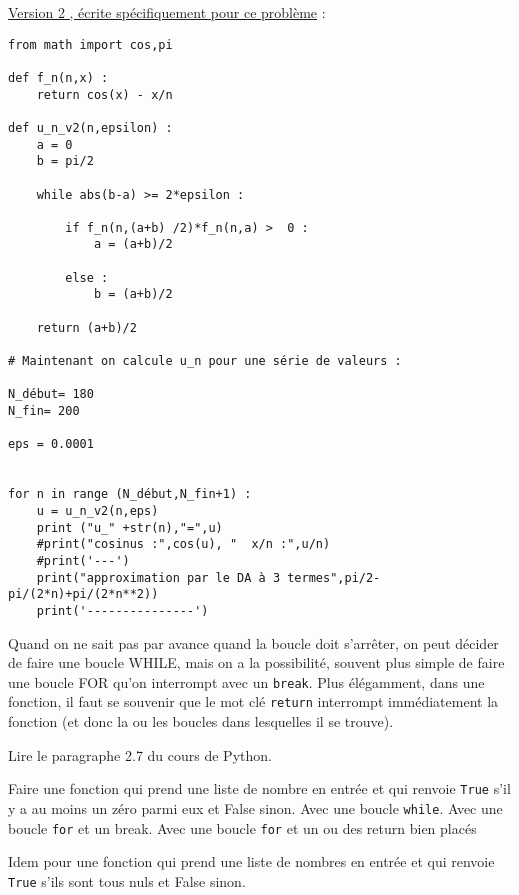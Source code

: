 \begin{correction}
	\nipuce  \ul{Version 2 , écrite spécifiquement pour ce problème} :

	\begin{verbatim}
from math import cos,pi

def f_n(n,x) :
    return cos(x) - x/n

def u_n_v2(n,epsilon) :
    a = 0
    b = pi/2

    while abs(b-a) >= 2*epsilon :

        if f_n(n,(a+b) /2)*f_n(n,a) >  0 :
            a = (a+b)/2

        else :
            b = (a+b)/2

    return (a+b)/2

# Maintenant on calcule u_n pour une série de valeurs :

N_début= 180
N_fin= 200

eps = 0.0001


for n in range (N_début,N_fin+1) :
    u = u_n_v2(n,eps)
    print ("u_" +str(n),"=",u)
    #print("cosinus :",cos(u), "  x/n :",u/n)
    #print('---')
    print("approximation par le DA à 3 termes",pi/2-pi/(2*n)+pi/(2*n**2))
    print('---------------')
\end{verbatim}
\end{correction}

\exo

\begin{enonce}
	Quand on ne sait pas par avance quand la boucle doit s'arrêter, on peut décider de faire une boucle WHILE, mais on a la possibilité, souvent plus simple de faire une boucle FOR qu'on interrompt avec un \texttt{break}. Plus élégamment, dans une fonction, il faut se souvenir que le mot clé \texttt{return} interrompt immédiatement la fonction (et donc la ou les boucles dans lesquelles il se trouve).

	\ques Lire le paragraphe 2.7 du cours de Python.



	\ques Faire une fonction qui prend une liste de nombre en entrée et qui renvoie \texttt{True} s'il y a au moins un zéro parmi eux et False sinon.
	\ssques Avec une boucle \texttt{while}.
	\ssques Avec une boucle \texttt{for} et un break.
	\ssques Avec une boucle \texttt{for} et un ou des return bien placés

	\ques Idem pour  une fonction qui prend une liste de nombres en entrée et qui renvoie \texttt{True} s'ils sont tous nuls et False sinon.




\end{enonce}

\begin{correction}

\end{correction}
